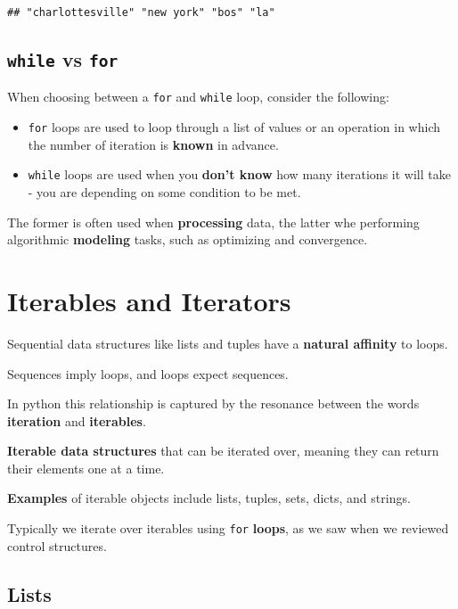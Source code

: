 \documentclass[
]{book}
\begin{document}
\begin{verbatim}
## "charlottesville" "new york" "bos" "la"
\end{verbatim}

\subsection{\texorpdfstring{\texttt{while} vs \texttt{for}}{while vs for}}\label{while-vs-for}

When choosing between a \texttt{for} and \texttt{while} loop, consider the following:

\begin{itemize}
\item
  \texttt{for} loops are used to loop through a list of values or an operation in which the number of iteration is \textbf{known} in advance.
\item
  \texttt{while} loops are used when you \textbf{don't know} how many iterations it will take - you are depending on some condition to be met.
\end{itemize}

The former is often used when \textbf{processing} data, the latter whe performing algorithmic \textbf{modeling} tasks, such as optimizing and convergence.

\section{Iterables and Iterators}\label{iterables-and-iterators}

Sequential data structures like lists and tuples have a \textbf{natural affinity} to loops.

Sequences imply loops, and loops expect sequences.

In python this relationship is captured by the resonance between the words \textbf{iteration} and \textbf{iterables}.

\textbf{Iterable data structures} that can be iterated over, meaning they can return their elements one at a time.

\textbf{Examples} of iterable objects include lists, tuples, sets, dicts, and strings.

Typically we iterate over iterables using \texttt{for} \textbf{loops}, as we saw when we reviewed control structures.

\subsection{Lists}\label{lists}
\end{document}
